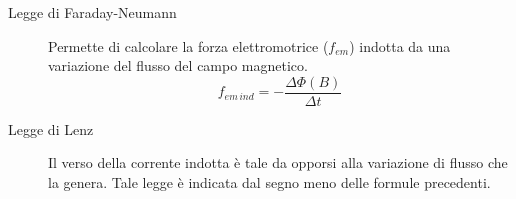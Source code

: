 \documentclass[a4paper,11pt,italian]{article}
\begin{document}
\begin{description}
  \item[Legge di Faraday-Neumann] 
  Permette di calcolare la forza elettromotrice ($ f_{em} $) indotta da una variazione del flusso del campo magnetico.
  \[ f_{em \, ind} =  - \frac{\Delta \Phi(B)}{\Delta t} \]
  
  
  \item[Legge di Lenz] 
  Il verso della corrente indotta è tale da opporsi alla variazione di flusso che la genera. 
  Tale legge è indicata dal segno meno delle formule precedenti.
  
%   
%   
%
%


\end{description}
\end{document}
